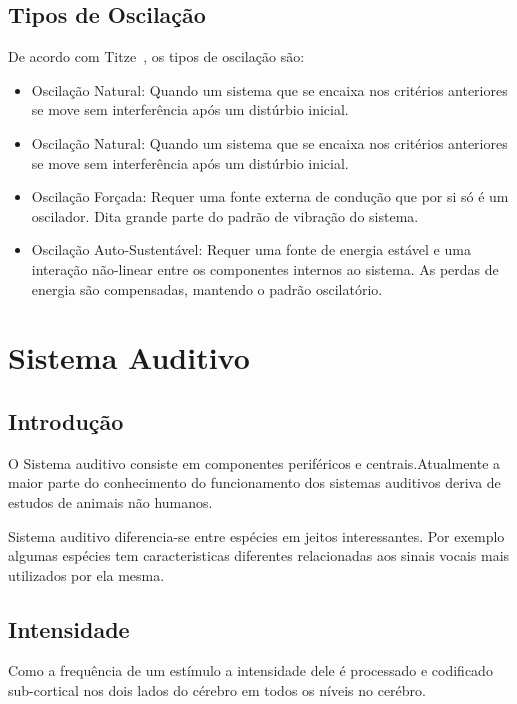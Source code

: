 	\subsection{Tipos de Oscilação}
			De acordo com Titze~\cite{IngoTitze}, os tipos de oscilação são:
			\begin{itemize}
				\item  Oscilação Natural: Quando um sistema que se encaixa nos critérios anteriores se move sem interferência após um distúrbio inicial.
				\item Oscilação Natural: Quando um sistema que se encaixa nos critérios anteriores se move sem interferência após um distúrbio inicial.
				\item Oscilação Forçada: Requer uma fonte externa de condução que por si só é um
				oscilador. Dita grande parte do padrão de vibração do sistema.
				\item Oscilação Auto-Sustentável: Requer uma fonte de energia estável e uma interação não-linear entre os componentes internos ao sistema. As perdas de energia são compensadas, mantendo o padrão oscilatório.
			\end{itemize}
		






	\section{Sistema Auditivo}
	\subsection{Introdução}
	O Sistema auditivo consiste em componentes periféricos e centrais.Atualmente a maior parte do conhecimento do funcionamento dos sistemas auditivos deriva de estudos de animais não humanos.\cite{Foundation1} 
	
	Sistema auditivo diferencia-se entre espécies em jeitos interessantes.
	Por exemplo algumas espécies tem caracteristicas diferentes relacionadas aos sinais vocais mais utilizados por ela mesma.\cite{Foundation1}
	
	\subsection{Intensidade}
	Como a frequência de um estímulo a intensidade dele é processado e codificado sub-cortical nos dois lados do cérebro em todos os níveis no cerébro.\cite{Foundation1}
	
